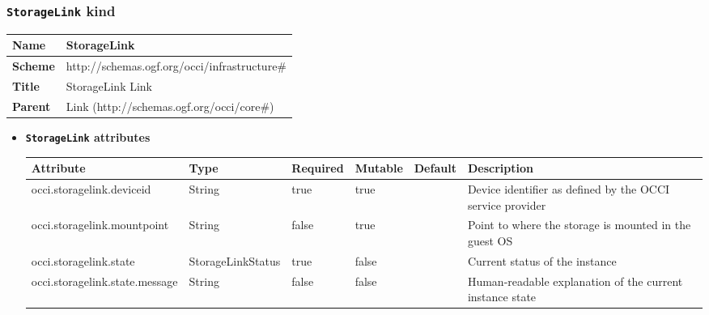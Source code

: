 \subsubsection{\texttt{StorageLink} kind}
\begin{center}
\begin{tabular}{|l|l|}
  \hline
  \textbf{Name} & StorageLink \\
  \hline  
  \textbf{Scheme} & http://schemas.ogf.org/occi/infrastructure\# \\
  \hline
  \textbf{Title} & StorageLink Link \\
  \hline
  \textbf{Parent} & Link (http://schemas.ogf.org/occi/core\#) \\
  \hline
\end{tabular}
\end{center}
\begin{itemize}
\item \textbf{\texttt{StorageLink} attributes}

\begin{tabularx}{\textwidth}{|l|l|p{1.4cm}|p{1.3cm}|l|X|}
  \hline
  \textbf{Attribute} & \textbf{Type} & \textbf{Required} & \textbf{Mutable} & \textbf{Default} & \textbf{Description} \\
  \hline  
  occi.storagelink.deviceid & String & true & true &  & Device identifier as defined by the OCCI service provider \\
  \hline
  occi.storagelink.mountpoint & String & false & true &  & Point to where the storage is mounted in the guest OS \\
  \hline
  occi.storagelink.state & StorageLinkStatus & true & false &  & Current status of the instance \\
  \hline
  occi.storagelink.state.message & String & false & false &  & Human-readable explanation of the current instance state \\
  \hline
\end{tabularx}
\end{itemize}


